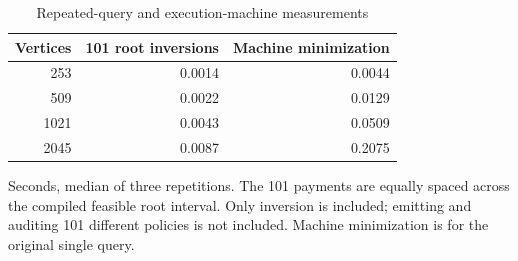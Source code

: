 \begin{table}[htbp]
\centering\small
\caption{Repeated-query and execution-machine measurements}\label{tab:ec-batch}
\begin{tabular}{rrr}
\toprule
Vertices & 101 root inversions & Machine minimization \\
\midrule
253 & 0.0014 & 0.0044 \\
509 & 0.0022 & 0.0129 \\
1021 & 0.0043 & 0.0509 \\
2045 & 0.0087 & 0.2075 \\
\bottomrule
\end{tabular}
\par\smallskip\begin{minipage}{\textwidth}\footnotesize Seconds, median of three repetitions. The 101 payments are equally spaced across the compiled feasible root interval. Only inversion is included; emitting and auditing 101 different policies is not included. Machine minimization is for the original single query.\end{minipage}
\end{table}
